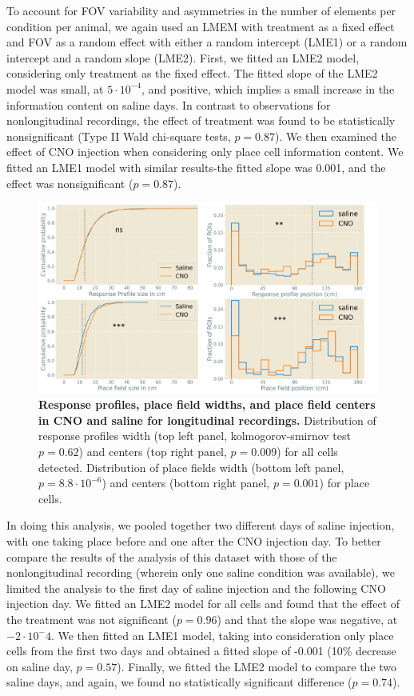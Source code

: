To account for FOV variability and asymmetries in the number of elements per condition per animal, we again used an LMEM with treatment as a fixed effect and FOV as a random effect with either a random intercept (LME1) or a random intercept and a random slope (LME2).
First, we fitted an LME2 model, considering only treatment as the fixed effect.
The fitted slope of the LME2 model was small, at $5\cdot 10^{-4}$, and positive, which implies a small increase in the information content on saline days.
In contrast to observations for nonlongitudinal recordings, the effect of treatment was found to be statistically nonsignificant (Type II Wald chi-square tests, $p=0.87$).
We then examined the effect of CNO injection when considering only place cell information content. We fitted an LME1 model with similar results-the fitted slope was 0.001, and the effect was nonsignificant ($p=0.87$).
\begin{figure}
    \centering
    \includegraphics[width=\textwidth]{Figures/Chapter4/pf_width_center_long.pdf}
    \caption[Response profiles, place field widths, and place field centers in CNO and saline for longitudinal recordings]{\textbf{Response profiles, place field widths, and place field centers in CNO and saline for longitudinal recordings.} 
    Distribution of response profiles width (top left panel, kolmogorov-smirnov test $p=0.62$) and centers (top right panel, $p=0.009$) for all cells detected.
    Distribution of place fields width (bottom left panel, $p=8.8 \cdot 10^{-6}$) and centers (bottom right panel, $p=0.001$) for place cells.}
    \label{fig:chap4:pf_width_center_long}
\end{figure}

In doing this analysis, we pooled together two different days of saline injection, with one taking place before and one after the CNO injection day. 
To better compare the results of the analysis of this dataset with those of the nonlongitudinal recording (wherein only one saline condition was available), we limited the analysis to the first day of saline injection and the following CNO injection day.
We fitted an LME2 model for all cells and found that the effect of the treatment was not significant ($p=0.96$) and that the slope was negative, at $-2\cdot 10^-4$.
We then fitted an LME1 model, taking into consideration only place cells from the first two days and obtained a fitted slope of -0.001 (10\% decrease on saline day, $p=0.57$).
Finally, we fitted the LME2 model to compare the two saline days, and again, we found no statistically significant difference ($p=0.74$).  

